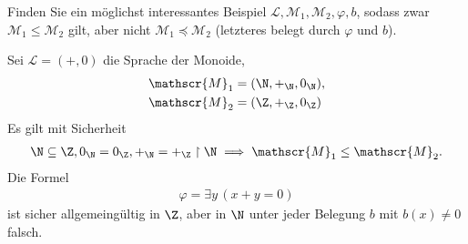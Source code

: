 
\begin{exercise}[142]
Finden Sie ein möglichst interessantes Beispiel $\mathscr{L},\mathscr{M}_1,\mathscr{M}_2,\varphi,b$,
sodass zwar $\mathscr{M}_1 \leq \mathscr{M}_2$ gilt, aber nicht $\mathscr{M}_1 \preccurlyeq \mathscr{M}_2$
(letzteres belegt durch $\varphi$ und $b$).
\end{exercise}


\begin{solution}
Sei $\mathscr{L} = (+,0)$ die Sprache der Monoide,
\begin{align*}
  \mathscr{M}_1 &= (\N,+_\N,0_\N), \\
  \mathscr{M}_2 &= (\Z,+_\Z,0_\Z)
\end{align*}
Es gilt mit Sicherheit
\begin{align*}
  \N \subseteq \Z, 0_\N = 0_\Z, +_\N = +_\Z\upharpoonright \N \implies \mathscr{M}_1 \leq \mathscr{M}_2.
\end{align*}
Die Formel
\begin{align*}
  \varphi = \exists y\,(x+y = 0)
\end{align*}
ist sicher allgemeingültig in $\Z$, aber in $\N$ unter jeder Belegung $b$ mit $b(x) \neq 0$ falsch.
\end{solution}

